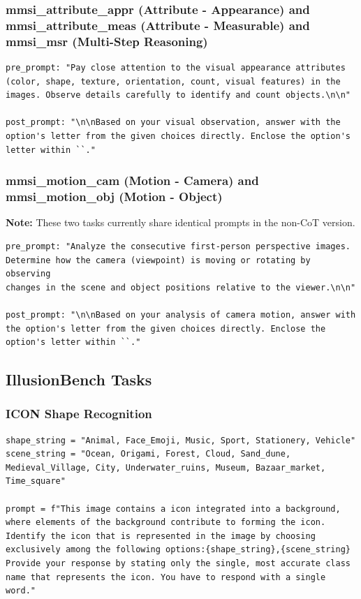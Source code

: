 \documentclass{article}
\theoremstyle{plain}
\theoremstyle{definition}
\theoremstyle{remark}
\begin{document}
\subsubsection{mmsi\_attribute\_appr (Attribute - Appearance) and mmsi\_attribute\_meas (Attribute - Measurable) and mmsi\_msr (Multi-Step Reasoning)}

\begin{verbatim}
pre_prompt: "Pay close attention to the visual appearance attributes
(color, shape, texture, orientation, count, visual features) in the
images. Observe details carefully to identify and count objects.\n\n"

post_prompt: "\n\nBased on your visual observation, answer with the
option's letter from the given choices directly. Enclose the option's
letter within ``."
\end{verbatim}

\subsubsection{mmsi\_motion\_cam (Motion - Camera) and mmsi\_motion\_obj (Motion - Object)}

\textbf{Note:} These two tasks currently share identical prompts in the non-CoT version.

\begin{verbatim}
pre_prompt: "Analyze the consecutive first-person perspective images.
Determine how the camera (viewpoint) is moving or rotating by observing
changes in the scene and object positions relative to the viewer.\n\n"

post_prompt: "\n\nBased on your analysis of camera motion, answer with
the option's letter from the given choices directly. Enclose the
option's letter within ``."
\end{verbatim}

\subsection{IllusionBench Tasks}

\subsubsection{ICON Shape Recognition}

\begin{verbatim}
shape_string = "Animal, Face_Emoji, Music, Sport, Stationery, Vehicle"
scene_string = "Ocean, Origami, Forest, Cloud, Sand_dune,
Medieval_Village, City, Underwater_ruins, Museum, Bazaar_market,
Time_square"

prompt = f"This image contains a icon integrated into a background,
where elements of the background contribute to forming the icon.
Identify the icon that is represented in the image by choosing
exclusively among the following options:{shape_string},{scene_string}
Provide your response by stating only the single, most accurate class
name that represents the icon. You have to respond with a single word."
\end{verbatim}
\end{document}
